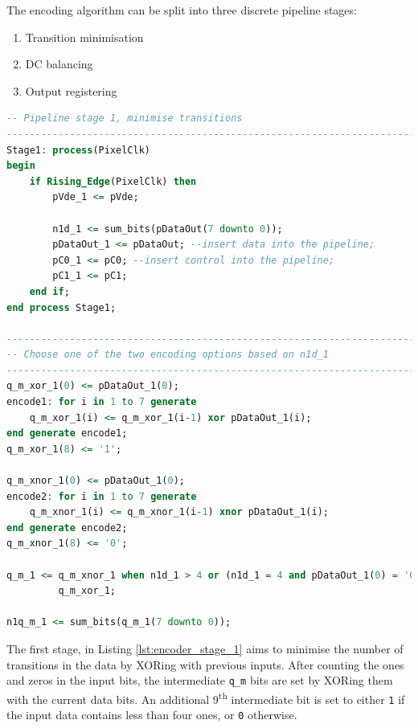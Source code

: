 The encoding algorithm can be split into three discrete pipeline stages:
\begin{enumerate}
    \item Transition minimisation
    \item DC balancing
    \item Output registering
\end{enumerate}

\begin{lstlisting}[caption={TMDS encoder transition minimisation stage.}, label={lst:encoder_stage_1}, language=VHDL]
-- Pipeline stage 1, minimise transitions
----------------------------------------------------------------------------------
Stage1: process(PixelClk)
begin
    if Rising_Edge(PixelClk) then
        pVde_1 <= pVde;

        n1d_1 <= sum_bits(pDataOut(7 downto 0));
        pDataOut_1 <= pDataOut; --insert data into the pipeline;
        pC0_1 <= pC0; --insert control into the pipeline;
        pC1_1 <= pC1;
    end if;
end process Stage1;

----------------------------------------------------------------------------------
-- Choose one of the two encoding options based on n1d_1
----------------------------------------------------------------------------------
q_m_xor_1(0) <= pDataOut_1(0);
encode1: for i in 1 to 7 generate
    q_m_xor_1(i) <= q_m_xor_1(i-1) xor pDataOut_1(i);
end generate encode1;
q_m_xor_1(8) <= '1';

q_m_xnor_1(0) <= pDataOut_1(0);
encode2: for i in 1 to 7 generate
    q_m_xnor_1(i) <= q_m_xnor_1(i-1) xnor pDataOut_1(i);
end generate encode2;
q_m_xnor_1(8) <= '0';

q_m_1 <= q_m_xnor_1 when n1d_1 > 4 or (n1d_1 = 4 and pDataOut_1(0) = '0') else
         q_m_xor_1;

n1q_m_1 <= sum_bits(q_m_1(7 downto 0));
\end{lstlisting}

The first stage, in Listing \ref{lst:encoder_stage_1} aims to minimise the number of transitions in the data by XORing with previous inputs. After counting the ones and zeros in the input bits, the intermediate \texttt{q\_m} bits are set by XORing them with the current data bits. An additional 9\textsuperscript{th} intermediate bit is set to either \texttt{1} if the input data contains less than four ones, or \texttt{0} otherwise.

